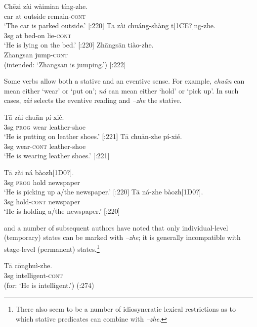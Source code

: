 \ea
\ea \gll  Ch\=ezi  zài  wàimian  tíng-zhe.\\
car  at  outside  remain-\textsc{cont} \\
\glt ‘The car is parked outside.’  [\citealt{LiThompson1981}:220]
\ex \gll  T\=a  zài  chuáng-shàng  t[1CE?]ng-zhe.\\
3sg  at  bed-on  lie-\textsc{cont}\\
\glt ‘He is lying on the bed.’  [\citealt{LiThompson1981}:220]
\ex \gll  *Zh\=angs\=an  tiào-zhe.\\
  Zhangsan  jump-\textsc{cont}\\
\glt (intended: ‘Zhangsan is jumping.’)   [\citealt{LiThompson1981}:222]
\z \z


Some verbs allow both a stative and an eventive sense. For example, \textit{chu\=an} can mean either ‘wear’ or ‘put on’; \textit{ná} can mean either ‘hold’ or ‘pick up’. In such cases, \textit{zài} selects the eventive reading and \textit{–zhe} the stative.


\ea
\ea \gll  T\=a  zài  chu\=an  pí-xié.\\
3sg  \textsc{prog}  wear  leather-shoe\\
\glt ‘He is putting on leather shoes.’  [\citealt{LiThompson1981}:221]
\ex \gll T\=a  chu\=an-zhe  pí-xié.\\
3sg  wear-\textsc{cont}  leather-shoe\\
\glt ‘He is wearing leather shoes.’  [\citealt{LiThompson1981}:221]
\z \z

\ea
\ea \gll  T\=a  zài  ná  bàozh[1D0?].\\
3sg  \textsc{prog}  hold  newspaper\\
\glt ‘He is picking up a/the newspaper.’  [\citealt{LiThompson1981}:220]
\ex \gll  T\=a  ná-zhe  bàozh[1D0?].\\
3sg  hold-\textsc{cont}  newspaper\\
\glt ‘He is holding a/the newspaper.’  [\citealt{LiThompson1981}:220]
\z \z


\citet{Yeh1993} and a number of subsequent authors have noted that only individual-level (temporary) states can be marked with \textit{–zhe}; it is generally incompatible with stage-level (permanent) states.\footnote{There also seem to be a number of idiosyncratic lexical restrictions as to which stative predicates can combine with \textit{–zhe}.}


\ea
\gll   *T\=a  c\=onghuì-zhe.\\
  3sg  intelligent-\textsc{cont}  \\
\glt (for: ‘He is intelligent.’)  (\citealt{Smith1997}:274)
\z


